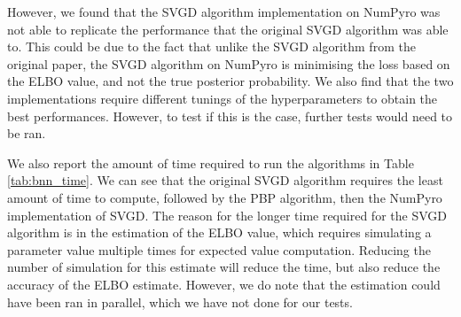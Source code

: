 However, we found that the SVGD algorithm implementation on NumPyro was not able to replicate the performance that the original SVGD algorithm was able to. This could be due to the fact that unlike the SVGD algorithm from the original paper, the SVGD algorithm on NumPyro is minimising the loss based on the ELBO value, and not the true posterior probability. We also find that the two implementations require different tunings of the hyperparameters to obtain the best performances. However, to test if this is the case, further tests would need to be ran.

We also report the amount of time required to run the algorithms in Table \ref{tab:bnn_time}. We can see that the original SVGD algorithm requires the least amount of time to compute, followed by the PBP algorithm, then the NumPyro implementation of SVGD. The reason for the longer time required for the SVGD algorithm is in the estimation of the ELBO value, which requires simulating a parameter value multiple times for expected value computation. Reducing the number of simulation for this estimate will reduce the time, but also reduce the accuracy of the ELBO estimate. However, we do note that the estimation could have been ran in parallel, which we have not done for our tests.

